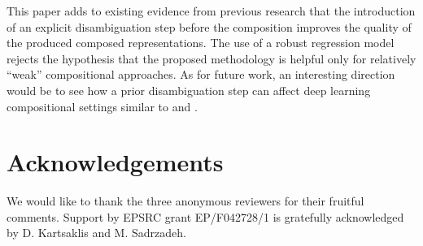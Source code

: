\documentclass[11pt]{article}
\begin{document}
This paper adds to existing evidence from previous research that the introduction of an explicit disambiguation step before the composition improves the quality of the produced composed representations. The use of a robust regression model rejects the hypothesis that the proposed methodology is helpful only for relatively ``weak'' compositional approaches. As for future work, an interesting direction would be to see how a prior disambiguation step can affect deep learning compositional settings similar to \cite{socher2012} and \cite{nal13emnlp}.

\section*{Acknowledgements}

We would like to thank the three anonymous reviewers for their fruitful comments. Support by EPSRC grant EP/F042728/1 is gratefully acknowledged by D. Kartsaklis and M. Sadrzadeh.



\end{document}

